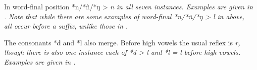 In word-final position *n/*ñ/*ŋ > \it{n} in all seven instances.
Examples are given in .
Note that while there are some examples of word-final *n/*ñ/*ŋ >
\it{l} in  above,
all occur before a suffix,
unlike those in .


The consonants *d
and *l also merge.
Before high vowels the usual reflex is \it{r},
though there is also one instance each of *d > \it{l}
and *l = \it{l} before high vowels.
Examples are given in .
\vspace{2pt}

